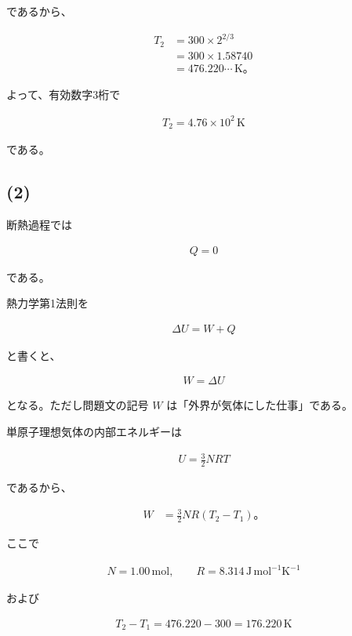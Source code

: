 \documentclass[platex,dvipdfmx,a4paper]{jsarticle}
\begin{document}
であるから、

\begin{align*}
T_2
&=
300\times
2^{2/3} \\
&=
300\times1.58740 \\
&=
476.220\cdots\,\mathrm{K}。
\end{align*}

よって、有効数字3桁で

\begin{align*}
T_2
=
4.76\times10^2\,\mathrm{K}
\end{align*}

である。

\subsection{(2)}

断熱過程では

\begin{align*}
Q=0
\end{align*}

である。

熱力学第1法則を

\begin{align*}
\Delta U=W+Q
\end{align*}

と書くと、

\begin{align*}
W=\Delta U
\end{align*}

となる。ただし問題文の記号 $W$ は「外界が気体にした仕事」である。

単原子理想気体の内部エネルギーは

\begin{align*}
U=\frac32NRT
\end{align*}

であるから、

\begin{align*}
W
&=
\frac32NR(T_2-T_1)。
\end{align*}

ここで

\begin{align*}
N=1.00\,\mathrm{mol},
\qquad
R=8.314\,\mathrm{J\,mol^{-1}K^{-1}}
\end{align*}

および

\begin{align*}
T_2-T_1
=
476.220-300
=
176.220\,\mathrm{K}
\end{align*}
\end{document}
